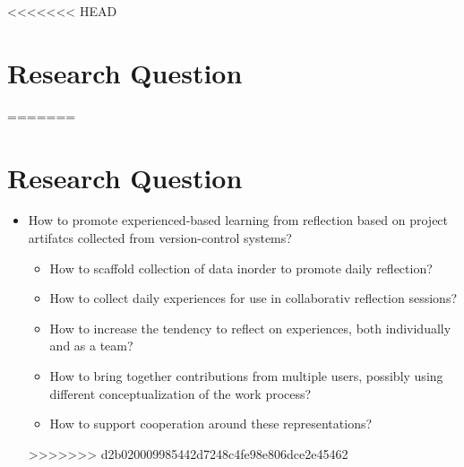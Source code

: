 <<<<<<< HEAD
\section{Research Question}

=======
\section{Research Question}

\begin{itemize}
	\item How to promote experienced-based learning from reflection based on project artifatcs collected from version-control systems?
	\begin{itemize}
		\item How to scaffold collection of data inorder to promote daily reflection?
		\item How to collect daily experiences for use in collaborativ reflection sessions?
		\item How to increase the tendency to reflect on experiences, both individually and as a team? 
		\item How to bring together contributions from multiple users, possibly using different conceptualization of the work process? 
		\item How to support cooperation around these representations?
	\end{itemize}
>>>>>>> d2b020009985442d7248c4fe98e806dce2e45462
\end{itemize}